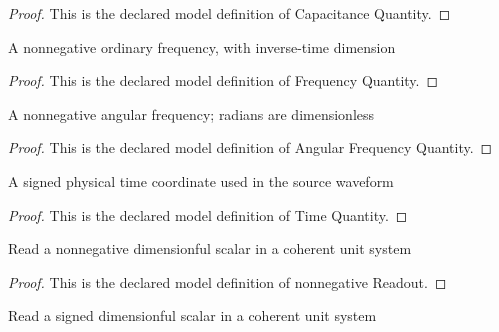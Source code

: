 \begin{proof}
  This is the declared model definition of Capacitance Quantity.
\end{proof}
\begin{definition}
  \label{def:physics:phyx-mini-0889:phyxminiproblems-problemphyxmini0889-frequencyquantity}
  A nonnegative ordinary frequency, with inverse-time dimension
\end{definition}
\begin{proof}
  This is the declared model definition of Frequency Quantity.
\end{proof}
\begin{definition}
  \label{def:physics:phyx-mini-0889:phyxminiproblems-problemphyxmini0889-angularfrequencyquantity}
  A nonnegative angular frequency; radians are dimensionless
\end{definition}
\begin{proof}
  This is the declared model definition of Angular Frequency Quantity.
\end{proof}
\begin{definition}
  \label{def:physics:phyx-mini-0889:phyxminiproblems-problemphyxmini0889-timequantity}
  A signed physical time coordinate used in the source waveform
\end{definition}
\begin{proof}
  This is the declared model definition of Time Quantity.
\end{proof}
\begin{definition}
  \label{def:physics:phyx-mini-0889:phyxminiproblems-problemphyxmini0889-nonnegativereadout}
  Read a nonnegative dimensionful scalar in a coherent unit system
\end{definition}
\begin{proof}
  This is the declared model definition of nonnegative Readout.
\end{proof}
\begin{definition}
  \label{def:physics:phyx-mini-0889:phyxminiproblems-problemphyxmini0889-signedreadout}
  Read a signed dimensionful scalar in a coherent unit system
\end{definition}

